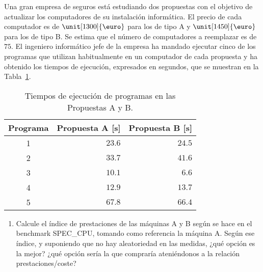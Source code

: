 \begin{comment}Sol:
La media geométrica de los tiempos de ejecución normalizados respecto de la máquina R son $2.20$ y $2.32$ para A y B respectivamente. En cualquier caso, estos datos permiten concluir que B rinde $1.06$ veces más que A. En cambio, la suma de los tiempos de ejecución son $322.4$s y $314.0$s respectivamente, lo que rebaja la mejora conseguida a $1.03$. Respecto a las diferencias, éstas no son significativas al 0.05 de significatividad porque el intervalo de confianza $[-6.8, 10.2]$ incluye el 0.
\end{comment}

\begin{ejercicio}\label{ej:4.14}
Una gran empresa de seguros está estudiando dos propuestas con el objetivo de actualizar los computadores de su instalación informática. El precio de cada computador es de $\unit[1300]{\text{\euro}}$ para los de tipo A y $\unit[1450]{\text{\euro}}$ para los de tipo B. Se estima que el número de computadores a reemplazar es de $75$. El ingeniero informático jefe de la empresa ha mandado ejecutar cinco de los programas que utilizan habitualmente en un computador de cada propuesta y ha obtenido los tiempos de ejecución, expresados en segundos, que se muestran en la Tabla~\ref{tab:ej:4.14}.
\begin{table}[h]
\centering
\begin{tabular}{@{}crr@{}}
\toprule
Programa & Propuesta A [s] & Propuesta B [s] \\ \midrule
1 & $23.6$ & $24.5$ \\
2 & $33.7$ & $41.6$ \\
3 & $10.1$ & $6.6$ \\
4 & $12.9$ & $13.7$ \\
5 & $67.8$ & $66.4$ \\ \bottomrule
\end{tabular}
\caption{Tiempos de ejecución de programas en las Propuestas A y B.}
\label{tab:ej:4.14}
\end{table}
\begin{enumerate}
    \item Calcule el índice de prestaciones de las máquinas A y B según se hace en el benchmark SPEC\_CPU, tomando como referencia la máquina A. Según ese índice, y suponiendo que no hay aleatoriedad en las medidas, ¿qué opción es la mejor? ¿qué opción sería la que compraría ateniéndonos a la relación prestaciones/coste?
    

\end{enumerate}
\end{ejercicio}
